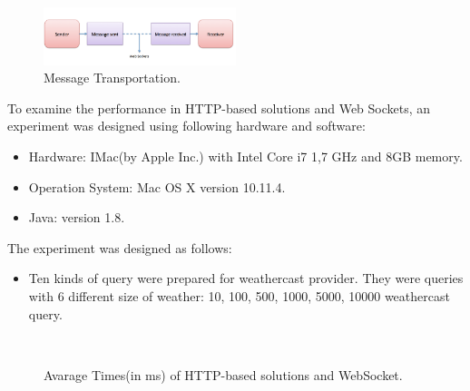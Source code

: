 \begin{figure}[!htb]
  \centering
  \includegraphics[width=0.5\textwidth]{Figures/websocket.png}
  \caption[Message Transportation.]{Message Transportation.}
  \label{fig:websocket}
\end{figure}

To examine the performance in HTTP-based solutions and Web Sockets, an experiment was designed using following hardware and software:

\begin{itemize}
\item 	Hardware: IMac(by Apple Inc.) with Intel Core i7 1,7 GHz and 8GB memory.
\item 	Operation System: Mac OS X version 10.11.4.
\item 	Java: version 1.8.
\end{itemize}

The experiment was designed as follows:
\begin{itemize}
\item Ten kinds of query were prepared for weathercast provider. They were queries with 6 different size of weather: 10, 100, 500, 1000, 5000, 10000 weathercast query.
\end{itemize}
\\
\begin{figure}
\caption{Avarage Times(in ms) of HTTP-based solutions and WebSocket.}
\label{fig:executiontimewebsocket}
\end{figure}
\\

